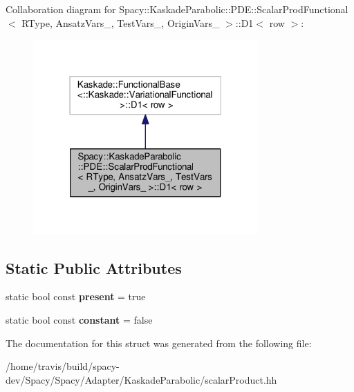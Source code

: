 Collaboration diagram for Spacy\-:\-:Kaskade\-Parabolic\-:\-:P\-D\-E\-:\-:Scalar\-Prod\-Functional$<$ R\-Type, Ansatz\-Vars\-\_\-, Test\-Vars\-\_\-, Origin\-Vars\-\_\- $>$\-:\-:D1$<$ row $>$\-:
\nopagebreak
\begin{figure}[H]
\begin{center}
\leavevmode
\includegraphics[width=244pt]{structSpacy_1_1KaskadeParabolic_1_1PDE_1_1ScalarProdFunctional_1_1D1__coll__graph}
\end{center}
\end{figure}
\subsection*{Static Public Attributes}
\begin{DoxyCompactItemize}
\item 
\hypertarget{structSpacy_1_1KaskadeParabolic_1_1PDE_1_1ScalarProdFunctional_1_1D1_af9ec3829c956766ec8c32766ce9a5f84}{static bool const {\bfseries present} = true}\label{structSpacy_1_1KaskadeParabolic_1_1PDE_1_1ScalarProdFunctional_1_1D1_af9ec3829c956766ec8c32766ce9a5f84}

\item 
\hypertarget{structSpacy_1_1KaskadeParabolic_1_1PDE_1_1ScalarProdFunctional_1_1D1_ac02ee366a21c95f7103c6d5b5fc606a4}{static bool const {\bfseries constant} = false}\label{structSpacy_1_1KaskadeParabolic_1_1PDE_1_1ScalarProdFunctional_1_1D1_ac02ee366a21c95f7103c6d5b5fc606a4}

\end{DoxyCompactItemize}


The documentation for this struct was generated from the following file\-:\begin{DoxyCompactItemize}
\item 
/home/travis/build/spacy-\/dev/\-Spacy/\-Spacy/\-Adapter/\-Kaskade\-Parabolic/scalar\-Product.\-hh\end{DoxyCompactItemize}
